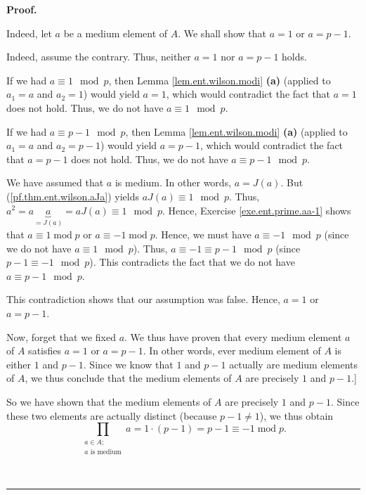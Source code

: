 \documentclass[numbers=enddot,12pt,final,onecolumn,notitlepage]{scrartcl}%
\numberwithin{exer}{subsection}
\theoremstyle{definition}
\newenvironment{fineprint}{\begin{small}}{\end{small}}
\newenvironment{proof}[1][Proof]{\noindent\textbf{#1.} }{\ \rule{0.5em}{0.5em}}
\let\prodnonlimits\prod
\renewcommand{\prod}{\prodnonlimits\limits}
\begin{document}
\begin{proof}
\begin{fineprint}
Indeed, let $a$ be a medium element of $A$. We shall show that $a=1$ or
$a=p-1$.

Indeed, assume the contrary. Thus, neither $a=1$ nor $a=p-1$ holds.

If we had $a \equiv1 \mod p$, then Lemma \ref{lem.ent.wilson.modi}
\textbf{(a)} (applied to $a_{1}=a$ and $a_{2}=1$) would yield $a = 1$, which
would contradict the fact that $a=1$ does not hold. Thus, we do not have $a
\equiv1 \mod p$.

If we had $a \equiv p-1 \mod p$, then Lemma \ref{lem.ent.wilson.modi}
\textbf{(a)} (applied to $a_{1}=a$ and $a_{2}=p-1$) would yield $a = p-1$,
which would contradict the fact that $a=p-1$ does not hold. Thus, we do not
have $a \equiv p-1 \mod p$.

We have assumed that $a$ is medium. In other words, $a = J\left(  a\right)  $.
But (\ref{pf.thm.ent.wilson.aJa}) yields $aJ\left(  a \right)  \equiv1
\mod p$. Thus, $a^{2} = a \underbrace{a}_{= J\left(  a \right)  } = aJ\left(
a \right)  \equiv1 \mod p$. Hence, Exercise \ref{exe.ent.prime.aa-1} shows
that $a\equiv1\operatorname{mod}p$ or $a\equiv-1\operatorname{mod}p$. Hence,
we must have $a \equiv-1 \mod p$ (since we do not have $a \equiv1 \mod p$).
Thus, $a \equiv-1 \equiv p-1 \mod p$ (since $p-1 \equiv-1 \mod p$). This
contradicts the fact that we do not have $a \equiv p-1 \mod p$.

This contradiction shows that our assumption was false. Hence, $a = 1$ or $a =
p-1$.

Now, forget that we fixed $a$. We thus have proven that every medium element
$a$ of $A$ satisfies $a=1$ or $a=p-1$. In other words, ever medium element of
$A$ is either $1$ and $p-1$. Since we know that $1$ and $p-1$ actually are
medium elements of $A$, we thus conclude that the medium elements of $A$ are
precisely $1$ and $p-1$.]

So we have shown that the medium elements of $A$ are precisely $1$ and $p-1$.
Since these two elements are actually distinct (because $p-1\neq1$), we thus
obtain%
\begin{equation}
\prod_{\substack{a\in A;\\a\text{ is medium}}}a=1\cdot\left(  p-1\right)
=p-1\equiv-1\operatorname{mod}p. \label{pf.thm.ent.wilson.prodmed}%
\end{equation}



\end{fineprint}
\end{proof}
\end{document}
